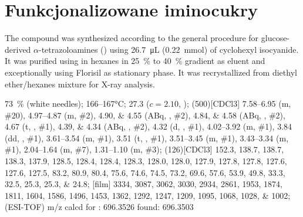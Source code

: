 \section{Funkcjonalizowane iminocukry}\label{experimental:iminosugars}
The compound was synthesized according to the general procedure for glucose-derived $\alpha$-tetrazoloamines () using \SI{26.7}{\micro\liter} (\SI{0.22}{\milli\mol}) of cyclohexyl isocyanide.
It was purified using  in hexanes in \SI{25}{\percent} to \SI{40}{\percent} gradient as eluent and exceptionally using Florisil\textsuperscript{\textregistered} as stationary phase.
It was recrystallized from diethyl ether/hexanes mixture for X-ray analysis.
\begin{fullexp}
	 \SI{73}{\percent} (white needles); 
	 \numrange{166}{167}\si{\celsius}; 
	\data{[$\alpha^{23}_D$]~$=$} \num{27.3} ($c = 2.10$, ); 
	\NMR(500)[CDCl3] \numrange{7.58}{6.95} (m, \#{20}), \numrange{4.97}{4.87} (m, \#{2}), \numlist{4.90;4.55} (ABq, , \#{2}), \numlist{4.84;4.58} (ABq, , \#{2}), \num{4.67} (t, , \#{1}), \numlist{4.39;4.34} (ABq, , \#{2}), \num{4.32} (d, , \#{1}), \numrange{4.02}{3.92} (m, \#{1}), \num{3.84} (dd, , \#{1}), \numrange{3.61}{3.54} (m, \#{1}), \num{3.51} (t, , \#{1}), \numrange{3.51}{3.45} (m, \#{1}), \numrange{3.43}{3.34} (m, \#{1}), \numrange{2.04}{1.64} (m, \#{7}), \numrange{1.31}{1.10} (m, \#{3}); 
	(126)[CDCl3] \numlist{152.3; 138.7; 138.7; 138.3; 137.9; 128.5; 128.4; 128.4; 128.3; 128.0; 128.0; 127.9; 127.8; 127.8; 127.6; 127.6; 127.5; 83.2; 80.9; 80.4; 75.6; 74.6; 74.5; 73.2; 69.6; 57.6; 53.9; 49.8; 33.3; 32.5; 25.3; 25.3; 24.8}; 
	[film] \numlist{3334; 3087; 3062; 3030; 2934; 2861; 1953; 1874; 1811; 1604; 1586; 1496; 1453; 1362; 1292; 1247; 1209; 1095; 1068; 1028; 1002}; 
	 (ESI-TOF) m/z calcd for : \num{696.3526} found: \num{696.3503}
\end{fullexp}

